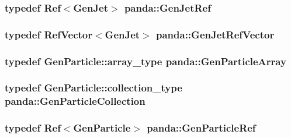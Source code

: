 \label{namespacepanda_a35dec08f9805131c733e00465133b558}
\hypertarget{namespacepanda_a0b877f84d6324c2cd1b857eaeef95e8b}{
\subsubsection[{GenJetRef}]{\setlength{\rightskip}{0pt plus 5cm}typedef {\bf Ref}$<${\bf GenJet}$>$ {\bf panda::GenJetRef}}}
\label{namespacepanda_a0b877f84d6324c2cd1b857eaeef95e8b}
\hypertarget{namespacepanda_a09ed2c0da40890206cb40eb12d78df66}{
\subsubsection[{GenJetRefVector}]{\setlength{\rightskip}{0pt plus 5cm}typedef {\bf RefVector}$<${\bf GenJet}$>$ {\bf panda::GenJetRefVector}}}
\label{namespacepanda_a09ed2c0da40890206cb40eb12d78df66}
\hypertarget{namespacepanda_a2b72dce1b15a3c68886fe8de0aad88d3}{
\subsubsection[{GenParticleArray}]{\setlength{\rightskip}{0pt plus 5cm}typedef {\bf GenParticle::array\_\-type} {\bf panda::GenParticleArray}}}
\label{namespacepanda_a2b72dce1b15a3c68886fe8de0aad88d3}
\hypertarget{namespacepanda_acc1526558d791db03ba031527662ef5b}{
\subsubsection[{GenParticleCollection}]{\setlength{\rightskip}{0pt plus 5cm}typedef {\bf GenParticle::collection\_\-type} {\bf panda::GenParticleCollection}}}
\label{namespacepanda_acc1526558d791db03ba031527662ef5b}
\hypertarget{namespacepanda_ae0ab9f621218fc75452057f414235ffb}{
\subsubsection[{GenParticleRef}]{\setlength{\rightskip}{0pt plus 5cm}typedef {\bf Ref}$<${\bf GenParticle}$>$ {\bf panda::GenParticleRef}}}
